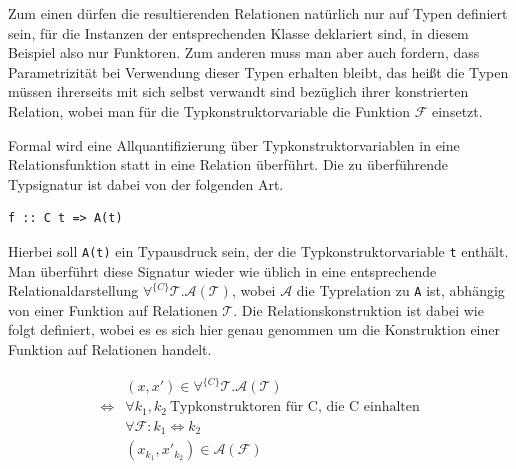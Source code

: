 
Zum einen dürfen die resultierenden Relationen natürlich nur auf Typen definiert sein, für die Instanzen der entsprechenden
Klasse deklariert sind, in diesem Beispiel also nur Funktoren.
Zum anderen muss man aber auch fordern, dass Parametrizität bei Verwendung dieser Typen erhalten bleibt,
das heißt die Typen müssen ihrerseits mit sich selbst verwandt sind bezüglich ihrer konstrierten Relation, wobei man für
die Typkonstruktorvariable die Funktion $\mathcal{F}$ einsetzt. 


Formal wird eine Allquantifizierung über Typkonstruktorvariablen in eine Relationsfunktion statt in eine Relation überführt. Die
zu überführende Typsignatur ist dabei von der folgenden Art.

\begin{verbatim}
f :: C t => A(t)
\end{verbatim}

Hierbei soll \texttt{A(t)} ein Typausdruck sein, der die Typkonstruktorvariable \texttt{t} enthält. Man überführt diese Signatur wieder
wie üblich in eine entsprechende Relationaldarstellung $\forall^{\{C\}} \mathcal{T} . \mathcal{A}(\mathcal{T})$, wobei $\mathcal{A}$
die Typrelation zu \texttt{A} ist, abhängig von einer Funktion auf Relationen $\mathcal{T}$. Die Relationskonstruktion ist
dabei wie folgt definiert, wobei es es sich hier genau genommen um die Konstruktion einer Funktion auf Relationen handelt.


\begin{align*}
& (x, x') \in \forall^{\{C\}} \mathcal{T} . \mathcal{A}(\mathcal{T}) \\
\Leftrightarrow & \forall k_1, k_2~\text{Typkonstruktoren für C, die C einhalten}\\
& \forall \mathcal{F} : k_1 \Leftrightarrow k_2 \\
& (x_{k_1}, x'_{k_2}) \in \mathcal{A}(\mathcal{F})
\end{align*}

